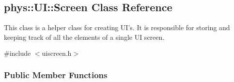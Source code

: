 \hypertarget{classphys_1_1UI_1_1Screen}{
\subsection{phys::UI::Screen Class Reference}
\label{classphys_1_1UI_1_1Screen}
}


This class is a helper class for creating UI's. It is responsible for storing and keeping track of all the elements of a single UI screen.  




{\ttfamily \#include $<$uiscreen.h$>$}

\subsubsection*{Public Member Functions}
